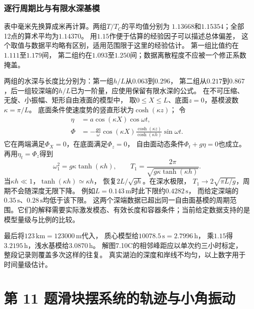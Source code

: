 \documentclass[UTF8,fontset=fandol,a4paper,11pt]{ctexart}
\newcommand{\tagline}[1]{\noindent{\small\color{muted}#1}\par}
\begin{document}
\subsubsection*{逐行周期比与有限水深基模}
表中毫米先换算成米再计算。两组$T/T_C$的平均值分别为
$1.13668$和$1.15354$；全部12点的算术平均为$1.14370$。
用$1.15$作便于估算的经验因子可以描述总体偏差，
这个取值与数据平均略有区别，适用范围限于这里的经验估计。
第一组比值约在$1.111$至$1.179$间，
第二组约在$1.093$至$1.250$间；数据离散程度不应被一个修正系数掩盖。

两组的水深与长度比分别为：第一组$h/L$从$0.063$到$0.296$，
第二组从$0.217$到$0.867$，后一组较深端的$h/L$已为一阶量，应使用保留有限水深的公式。
在不可压缩、无旋、小振幅、矩形自由液面的模型中，
取$0\le X\le L$、底面$z=0$，基模波数$\kappa=\pi/L$。
底面条件使速度势的竖直形状为$\cosh(\kappa z)$；
令
\[
\begin{aligned}
\eta&=a\cos(\kappa X)\cos\omega t,\\
\Phi&=-\frac{ga}{\omega}\cos(\kappa X)
\frac{\cosh(\kappa z)}{\cosh(\kappa h)}\sin\omega t.
\end{aligned}
\]
它在两端满足$\Phi_X=0$，在底面满足$\Phi_z=0$，
自由面动态条件$\Phi_t+g\eta=0$也成立。
再用$\eta_t=\Phi_z$得到
\[
\omega_1^2=g\kappa\tanh(\kappa h),\qquad
T_1=\frac{2\pi}{\sqrt{g\kappa\tanh(\kappa h)}}.
\]
当$\kappa h\ll1$，$\tanh(\kappa h)\simeq\kappa h$，
恢复$2L/\sqrt{gh}$。在深水极限，
$T_1\to2\sqrt{\pi L/g}$，周期不会随深度无限下降。
例如$L=0.143\,\mathrm m$时此下限约$0.4282\,\mathrm s$，
而给定深端的$0.35\,\mathrm s$、$0.28\,\mathrm s$均低于该下限。
这两个深端数据已超出同一自由面基模的周期范围。它们的解释需要实际激发模态、有效长度和容器条件；当前给定数据支持的是模型量级与比例的比较。

最后将$123\,\mathrm{km}=123000\,\mathrm m$代入，
质心模型给$10078.5\,\mathrm s=2.7996\,\mathrm h$，
乘$1.15$得$3.2195\,\mathrm h$，浅水基模给$3.0870\,\mathrm h$。
解图7.10C的相邻峰距应以单次约三小时标定，
整段记录则覆盖多次这样的往复。
真实湖泊的深度和岸线不均匀，以上数字用于时间量级估计。





\section*{第 11 题\quad 滑块摆系统的轨迹与小角振动}

\tagline{M-07-11}
\end{document}
